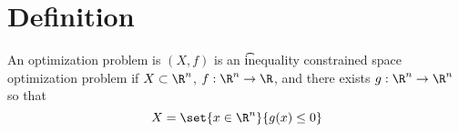 
\section*{Definition}

An optimization problem is $(X, f)$ is an \t{inequality constrained space optimization problem} if $X \subset \R ^n$, $f: \R ^n \to \R $, and there exists $g: \R ^n \to \R ^n$ so that
\[
X = \set{x \in \R ^n}{g(x) \leq 0}
\]

\blankpage